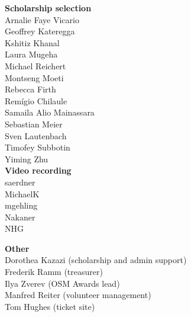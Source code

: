 \begin{multicols}{2}
\begin{small}
    \vspace{\volunteerSpace}
    \textbf{Scholarship selection}\\
    Arnalie Faye Vicario\\
    Geoffrey Kateregga\\
    Kshitiz Khanal\\
    Laura Mugeha\\
    Michael Reichert\\
    Montseng Moeti\\
    Rebecca Firth\\
    Remígio Chilaule\\
    Samaila Alio Mainassara\\
    Sebastian Meier\\
    Sven Lautenbach\\
    Timofey Subbotin\\
    Yiming Zhu\\

    \vspace{\volunteerSpace}
    \textbf{Video recording}\\
    saerdner\\
    MichaelK\\
    mgehling\\
    Nakaner\\
    NHG

    \vspace{\volunteerSpace}
    \textbf{Other}\\
    Dorothea Kazazi (scholarship and admin support)\\
    Frederik Ramm (treasurer)\\
    Ilya Zverev (OSM Awards lead)\\
    Manfred Reiter (volunteer management)\\
    Tom Hughes (ticket site)\\
  \end{small}
\end{multicols}
\justifying
